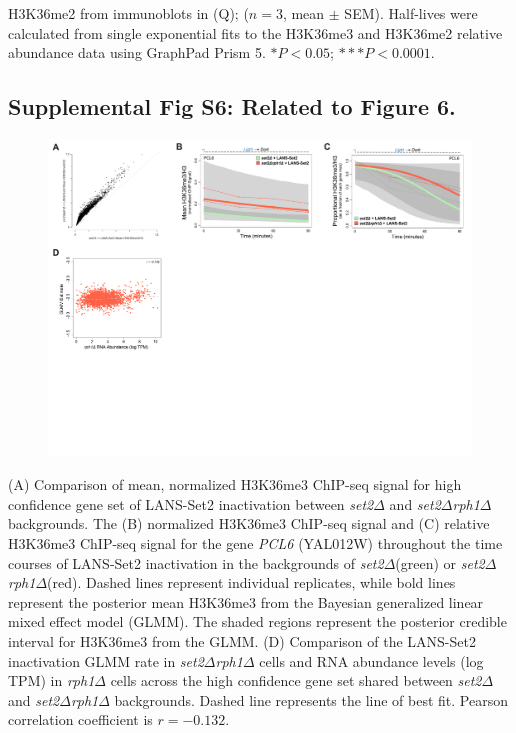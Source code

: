 \documentclass[11pt]{biorxiv}
\newcommand{\setdelt}{\emph{set2$\Delta$}\xspace}
\newcommand{\rphdelt}{\emph{rph1$\Delta$}\xspace}
\newcommand{\setdeltrphdelt}{\emph{set2$\Delta$rph1$\Delta$}\xspace}
\begin{document}
H3K36me2 from immunoblots in (Q); ($n = 3$, mean $\pm$ SEM). Half-lives were calculated from single exponential fits to the H3K36me3 and H3K36me2 relative abundance data using GraphPad Prism 5. $*P < 0.05$; $***P < 0.0001$. 

\clearpage

\subsection{Supplemental Fig S6: Related to Figure 6.}
\begin{figure}[ht!]
\center
\includegraphics[width=\textwidth, trim={0in 0in 0in 0in}, clip]{figures/Supplemental_Fig_S6_compressed.pdf}
\end{figure}
\vspace*{-1.5in}
\noindent (A) Comparison of mean, normalized H3K36me3 ChIP-seq signal for high confidence gene set of LANS-Set2 inactivation between \setdelt and \setdeltrphdelt backgrounds. The (B) normalized H3K36me3 ChIP-seq signal and (C) relative H3K36me3 ChIP-seq signal for the gene \emph{PCL6} (YAL012W) throughout the time courses of LANS-Set2 inactivation in the backgrounds of \setdelt (green) or \setdeltrphdelt (red). Dashed lines represent individual replicates, while bold lines represent the posterior mean H3K36me3 from the Bayesian generalized linear mixed effect model (GLMM). The shaded regions represent the posterior credible interval for H3K36me3 from the GLMM. (D) Comparison of the LANS-Set2 inactivation GLMM rate in \setdeltrphdelt cells and RNA abundance levels (log TPM) in \rphdelt cells across the high confidence gene set shared between \setdelt and \setdeltrphdelt backgrounds. Dashed line represents the line of best fit. Pearson correlation coefficient is $r=-0.132$. 
\end{document}
